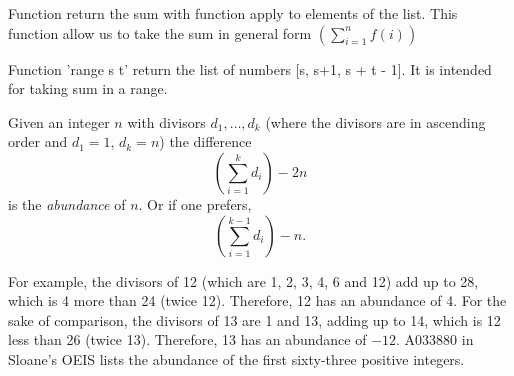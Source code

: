 \documentclass[12pt]{article}
\begin{document}
\begin{cnl}
\begin{remark}
    Function return the sum with function apply to elements of the list. This function allow us to take the sum in general form $\left( \sum_{i = 1}^n f(i) \right)$
\end{remark}



\begin{remark}
    Function 'range s t' return the list of numbers [s, s+1, s + t - 1]. It is intended for taking sum in a range.
\end{remark}






\begin{remark}
Given an integer $n$ with divisors $d_1, \ldots , d_k$ (where the divisors are in ascending order and $d_1 = 1$, $d_k = n$) the difference $$\left( \sum_{i = 1}^k d_i \right) - 2n$$ is the {\em abundance} of $n$. Or if one prefers, $$\left( \sum_{i = 1}^{k - 1} d_i \right) - n.$$

For example, the divisors of 12 (which are 1, 2, 3, 4, 6 and 12) add up to 28, which is 4 more than 24 (twice 12). Therefore, 12 has an abundance of 4. For the sake of comparison, the divisors of 13 are 1 and 13, adding up to 14, which is 12 less than 26 (twice 13). Therefore, 13 has an abundance of $-12$. A033880 in Sloane's OEIS lists the abundance of the first sixty-three positive integers.

\end{remark}








\end{cnl}
\end{document}
